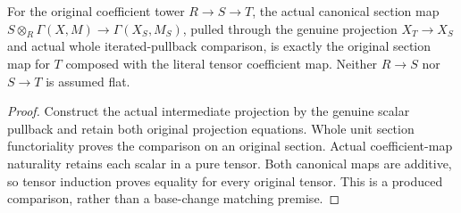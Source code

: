 \begin{lemma}
\label{lem:kn-arithmetic-original-line-power-basechange}
\leanok
{}
For the original coefficient tower $R\to S\to T$, the actual canonical
section map $S\otimes_R\Gamma(X,M)\to\Gamma(X_S,M_S)$, pulled through
the genuine projection $X_T\to X_S$ and actual whole iterated-pullback
comparison, is exactly the original section map for $T$ composed with
the literal tensor coefficient map. Neither $R\to S$ nor $S\to T$
is assumed flat.
\end{lemma}
\begin{proof}
Construct the actual intermediate projection by the genuine scalar
pullback and retain both original projection equations.  Whole unit
section functoriality proves the comparison on an original section.
Actual coefficient-map naturality retains each scalar in a pure tensor.
Both canonical maps are additive, so tensor induction proves equality
for every original tensor.  This is a produced comparison, rather than
a base-change matching premise.
\end{proof}

